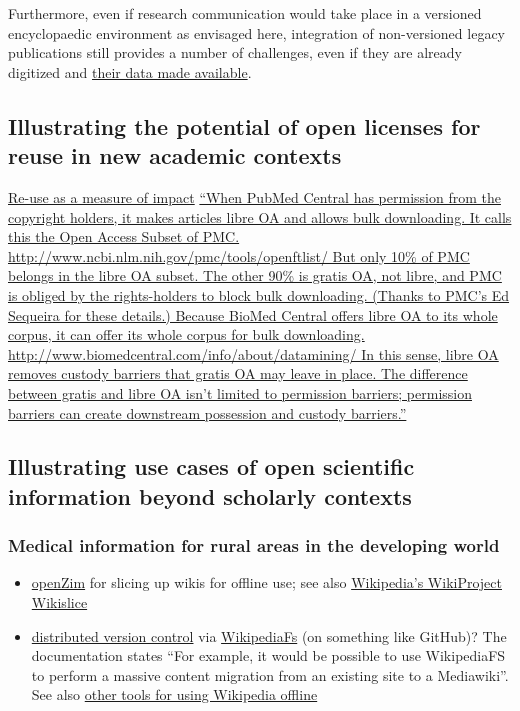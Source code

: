 \documentclass[final,authoryear,3p]{elsarticle-open-drafting}
\begin{document}
Furthermore, even if research communication would take place in a versioned encyclopaedic environment as envisaged here, integration of non-versioned legacy publications still provides a number of challenges, even if they are already digitized and \href{http://blog.datadryad.org/2011/02/22/archiving-legacy-data-or-why-is-dryad-better-than-a-floppy-disk/}{their data made available}.

\subsection{Illustrating the potential of open licenses for reuse in new academic contexts}
\href{http://altmetrics.org/workshop2011/neylon-v0/}{Re-use as a measure of impact}
\href{http://www.earlham.edu/~peters/fos/newsletter/06-02-11.htm}{``When PubMed Central has permission from the copyright holders, it makes articles libre OA and allows bulk downloading.  It calls this the Open Access Subset of PMC. 
http://www.ncbi.nlm.nih.gov/pmc/tools/openftlist/ But only 10\% of PMC belongs in the libre OA subset.  The other 90\% is gratis OA, not libre, and PMC is obliged by the rights-holders to block bulk downloading.  (Thanks to PMC's Ed Sequeira for these details.) Because BioMed Central offers libre OA to its whole corpus, it can offer its whole corpus for bulk downloading. 
http://www.biomedcentral.com/info/about/datamining/ In this sense, libre OA removes custody barriers that gratis OA may leave in place.  The difference between gratis and libre OA isn't limited to permission barriers; permission barriers can create downstream possession and custody barriers.''}

\subsection{Illustrating use cases of open scientific information beyond scholarly contexts}
\subsubsection{Medical information for rural areas in the developing world}
\begin{itemize}
	\item \href{http://www.openzim.org}{openZim} for slicing up wikis for offline use; see also \href{http://en.wikipedia.org/wiki/Wikipedia:WikiProject_Wikislice}{Wikipedia's WikiProject Wikislice}
	\item \href{http://lists.wikimedia.org/pipermail/foundation-l/2008-February/038623.html}{distributed version control} via \href{http://wikipediafs.sourceforge.net/}{WikipediaFs} (on something like GitHub)? The documentation states ``For example, it would be possible to use WikipediaFS to perform a massive content migration from an existing site to a Mediawiki''. See also \href{http://zikoblog.wordpress.com/2011/05/29/wikipedia-offline-2/}{other tools for using Wikipedia offline}

\end{itemize}
\end{document}
